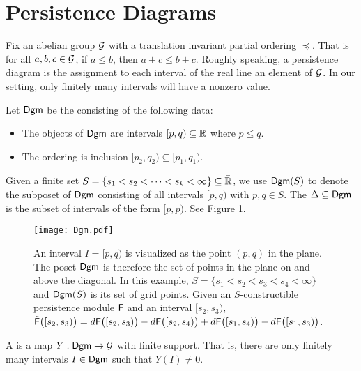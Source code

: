 \documentclass[12pt]{article}
\begin{document}
\section{Persistence Diagrams}

Fix an abelian group ${\mathcal{G}}$ with a translation invariant partial ordering $\preceq$.
That is for all $a, b, c \in {\mathcal{G}}$, if $a \leq b$, then $a + c \leq b +c$.
Roughly speaking, a persistence diagram is the assignment to each interval
of the real line an element of ${\mathcal{G}}$.
In our setting, only finitely many intervals will have a nonzero value.

\begin{defn}
Let ${\mathsf{Dgm}}$ be the  consisting of the following data:
	\begin{itemize}
	\item The objects of ${\mathsf{Dgm}}$ are intervals $[p,q) \subseteq \bar{{\mathbb R}}$
	where $p \leq q$.
	\item The ordering is inclusion $[p_2,q_2) \subseteq [p_1,q_1)$.
	\end{itemize}
Given a finite set $S=\{s_1< s_2< \cdots <s_k < \infty\}\subseteq\bar{{\mathbb R}}$, we use
${\mathsf{Dgm}}(S)$ to denote the subposet of ${\mathsf{Dgm}}$ consisting of all intervals $[p,q)$ 
with $p,q \in S$. 
The  $\Delta \subseteq {\mathsf{Dgm}}$ is the subset of intervals of the form 
$[p,p)$.
See Figure \ref{fig:dgm}.
\end{defn}

\begin{figure}
\begin{center}
\texttt{[image: Dgm.pdf]}
\end{center}
\caption{An interval $I = [p,q)$ is visualized as the point $(p,q)$ in the plane.
The poset ${\mathsf{Dgm}}$ is therefore the set of points in the plane
on and above the diagonal.
In this example, $S  = \{ s_1 < s_2 < s_3 < s_4 < \infty\}$ and 
${\mathsf{Dgm}}(S)$ is its set of grid points.
Given an $S$-constructible persistence module ${\mathsf{F}}$ and an interval $[s_2, s_3)$,
$\tilde{{\mathsf{F}}} \big( [s_2, s_3) \big) = d {\mathsf{F}} \big( [s_2, s_3) \big) - d {\mathsf{F}} \big( [s_2, s_4) \big) + d {\mathsf{F}} \big( [s_1, s_4) \big) - d {\mathsf{F}} \big( [s_1, s_3) \big)$.}
\label{fig:dgm}
\end{figure}


\begin{defn}
A  is a map
$Y : {\mathsf{Dgm}} \to {\mathcal{G}}$ with finite support.
That is, there are only finitely many intervals $I \in {\mathsf{Dgm}}$
such that $Y(I) \neq 0$.
\end{defn}
\end{document}
